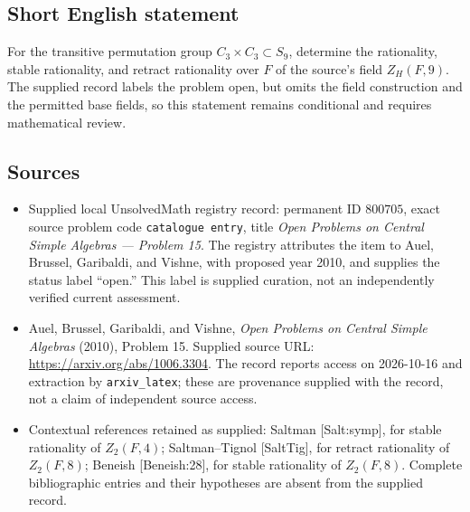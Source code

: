 \documentclass[11pt]{article}
\begin{document}
\subsection{Short English statement}
For the transitive permutation group \(C_3\times C_3\subset S_9\), determine the rationality, stable rationality, and retract rationality over \(F\) of the source's field \(Z_H(F,9)\). The supplied record labels the problem open, but omits the field construction and the permitted base fields, so this statement remains conditional and requires mathematical review.
\subsection{Sources}
\begin{itemize}
\item Supplied local UnsolvedMath registry record: permanent ID \(800705\), exact source problem code \texttt{catalogue entry}, title \emph{Open Problems on Central Simple Algebras --- Problem 15}. The registry attributes the item to Auel, Brussel, Garibaldi, and Vishne, with proposed year 2010, and supplies the status label ``open.'' This label is supplied curation, not an independently verified current assessment.
\item Auel, Brussel, Garibaldi, and Vishne, \emph{Open Problems on Central Simple Algebras} (2010), Problem 15. Supplied source URL: \url{https://arxiv.org/abs/1006.3304}. The record reports access on 2026-10-16 and extraction by \texttt{arxiv\_latex}; these are provenance supplied with the record, not a claim of independent source access.
\item Contextual references retained as supplied: Saltman [Salt:symp], for stable rationality of \(Z_2(F,4)\); Saltman--Tignol [SaltTig], for retract rationality of \(Z_2(F,8)\); Beneish [Beneish:28], for stable rationality of \(Z_2(F,8)\). Complete bibliographic entries and their hypotheses are absent from the supplied record.
\end{itemize}
\end{document}
